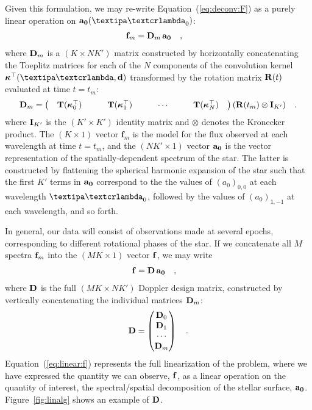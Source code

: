 \documentclass[modern]{aastex631}
\begin{document}
Given this formulation, we may re-write Equation~(\ref{eq:deconv:F}) as a purely linear operation on $\azero(\lnlam_0)$:
%
\begin{align}
    \label{eq:linear:ft}
    {\ensuremath{\mathbf{f}}}_m
     & =
    {\mathbf{D}}_m
    \,
    {\mathbf{a_0}}
    \quad,
\end{align}
%
where ${\mathbf{D}}_m$ is a $(K \times N K')$ matrix constructed by horizontally concatenating the Toeplitz matrices for each of the $N$ components of the convolution kernel $\kT(\lnlam, \Dargs)$ transformed by the rotation matrix ${\mathbf{R}}(t)$ evaluated at time $t = t_m$:
%
\begin{align}
    \label{eq:linear:Dm}
    {\ensuremath{\mathbf{D}}}_m =
    \begin{pmatrix}
        \quad
        {\ensuremath{\mathbf{T}}}(\boldsymbol{\kappa}^\top_0)
        \quad
         &
        \quad
        {\ensuremath{\mathbf{T}}}(\boldsymbol{\kappa}^\top_1)
        \quad
         &
        \quad
        \cdots
        \quad
         &
        \quad
        {\ensuremath{\mathbf{T}}}(\boldsymbol{\kappa}^\top_N)
        \quad
    \end{pmatrix}
    ({\mathbf{R}}(t_m) \otimes {\ensuremath{\mathbf{I}}}_{K'})
    \quad.
\end{align}
%
where ${\mathbf{I}}_{K'}$ is the $(K' \times K')$ identity matrix and $\otimes$ denotes the Kronecker product.
%
The $(K \times 1)$ vector $\mathbf{f}_m$ is the model for the flux observed at each wavelength at time $t = t_m$, and the $(N K' \times 1)$ vector ${\mathbf{a_0}}$ is the vector representation of the spatially-dependent spectrum of the star. 
The latter is constructed by flattening the spherical harmonic expansion of the star such that the first $K'$ terms in ${\mathbf{a_0}}$ correspond to the the values of $(a_0)_{0,0}$ at each wavelength $\lnlam_0$, followed by the values of $(a_0)_{1,-1}$ at each wavelength, and so forth.

In general, our data will consist of observations made at several epochs, corresponding to different rotational phases of the star.
If we concatenate all $M$ spectra ${\mathbf{f}}_m$ into the $(MK \times 1)$ vector ${\mathbf{f}}$, we may write
%
\begin{align}
    \label{eq:linear:f}
    {\ensuremath{\mathbf{f}}}
     & =
    {\mathbf{D}}
    \,
    {\mathbf{a_0}}
    \quad,
\end{align}
%
where ${\mathbf{D}}$ is the full $(MK \times N K')$ Doppler design matrix, constructed by vertically concatenating the individual matrices ${\mathbf{D}}_m$:
%
%
\begin{align}
    \label{eq:linear:D}
    {\ensuremath{\mathbf{D}}} =
    \begin{pmatrix}
        {\ensuremath{\mathbf{D}}}_0
        \\
        {\mathbf{D}}_1
        \\
        \cdots
        \\
        {\mathbf{D}}_m
    \end{pmatrix}
    \quad.
\end{align}
%
%
Equation~(\ref{eq:linear:f}) represents the full linearization of the problem, where we have expressed the quantity we can observe, ${\mathbf{f}}$, as a linear operation on the quantity of interest, the spectral/spatial decomposition of the stellar surface, ${\mathbf{a_0}}$. 
Figure~\ref{fig:linalg} shows an example of ${\mathbf{D}}$.
\end{document}

